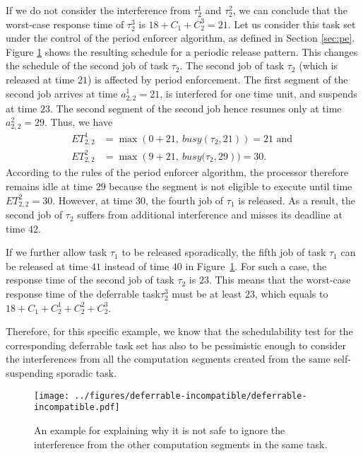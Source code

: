 If we do not consider the interference from $\tau_2^1$ and $\tau_2^2$, we can conclude that the worst-case response time of $\tau_2^3$ is  $18+C_1+C_2^3=21$.
Let us consider this task set under the control of the period enforcer algorithm, as defined in Section \ref{sec:pe}.
Figure \ref{fig:example-deferrable-incompatible} shows the resulting schedule for a periodic release pattern. This changes the schedule of the second job of task $\tau_2$. 
The second job of task $\tau_2$ (which is released at time $21$) is affected by period enforcement. The first segment of the second job arrives at time $a^1_{2,2} = 21$, is interfered for one time unit, and suspends at time $23$. The  second segment of the second job hence resumes only at time $a^2_{2,2} = 29$. Thus, we have
\begin{align*}
	ET_{2,2}^1 & = \max\left(0 + 21,\ \mathit{busy}(\tau_2, 21)\right) = 21  \text{ and }
\\
	ET_{2,2}^2 & = \max\left(9 + 21,\ \mathit{busy}(\tau_2, 29\right) ) = 30.
\end{align*}
According to the rules of the period enforcer algorithm, the processor therefore remains idle at time $29$ because the segment is not eligible to execute until time $ET_{2,2}^2 = 30$. However, at time $30$, the fourth job of $\tau_1$ is released. As a result, the second job of $\tau_2$ suffers from additional interference and misses its deadline at time $42$.

If we further allow task $\tau_1$ to be released sporadically, the fifth job of task $\tau_1$ can be released at time $41$ instead of time $40$ in Figure~\ref{fig:example-deferrable-incompatible}. For such a case, the response time of the second job of task $\tau_2$ is $23$. This means that the worst-case response time of the deferrable task$\tau_2^3$ must be at least $23$, which equals to $18+C_1 + C_2^1+C_2^2+C_2^3$.

Therefore, for this specific example, we know that the schedulability test for the  corresponding deferrable task set has also to be pessimistic enough to consider the interferences from all the computation segments created from the same self-suspending sporadic task.

\begin{figure}[t]
  \centering  
  \texttt{[image: ../figures/deferrable-incompatible/deferrable-incompatible.pdf]}
  \caption{An example for explaining why it is not safe to ignore the interference from the other computation segments in the same task.}
  \label{fig:example-deferrable-incompatible}
\end{figure}

